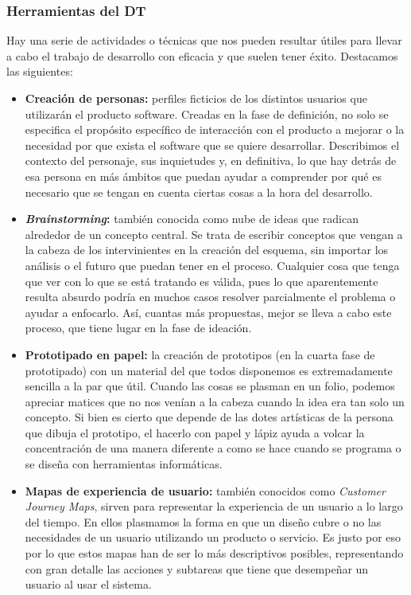 \subsubsection{Herramientas del DT}
\label{herramientasDT}

Hay una serie de actividades o técnicas que nos pueden resultar útiles para llevar a cabo el trabajo de desarrollo con eficacia y que suelen tener éxito. Destacamos las siguientes:

\begin{itemize}
	\item \textbf{Creación de personas:} perfiles ficticios de los distintos usuarios que utilizarán el producto software. Creadas en la fase de definición, no solo se especifica el propósito específico de interacción con el producto a mejorar o la necesidad por que exista el software que se quiere desarrollar. Describimos el contexto del personaje, sus inquietudes y, en definitiva, lo que hay detrás de esa persona en más ámbitos que puedan ayudar a comprender por qué es necesario que se tengan en cuenta ciertas cosas a la hora del desarrollo.
	
	\item \textbf{\textit{Brainstorming}:} también conocida como nube de ideas que radican alrededor de un concepto central. Se trata de escribir conceptos que vengan a la cabeza de los intervinientes en la creación del esquema, sin importar los análisis o el futuro que puedan tener en el proceso. Cualquier cosa que tenga que ver con lo que se está tratando es válida, pues lo que aparentemente resulta absurdo podría en muchos casos resolver parcialmente el problema o ayudar a enfocarlo. Así, cuantas más propuestas, mejor se lleva a cabo este proceso, que tiene lugar en la fase de ideación.
	
	\item \textbf{Prototipado en papel:} la creación de prototipos (en la cuarta fase de prototipado) con un material del que todos disponemos es extremadamente sencilla a la par que útil. Cuando las cosas se plasman en un folio, podemos apreciar matices que no nos venían a la cabeza cuando la idea era tan solo un concepto. Si bien es cierto que depende de las dotes artísticas de la persona que dibuja el prototipo, el hacerlo con papel y lápiz ayuda a volcar la concentración de una manera diferente a como se hace cuando se programa o se diseña con herramientas informáticas.
	
	\item \textbf{Mapas de experiencia de usuario:} también conocidos como \textit{Customer Journey Maps}, sirven para representar la experiencia de un usuario a lo largo del tiempo. En ellos plasmamos la forma en que un diseño cubre o no las necesidades de un usuario utilizando un producto o servicio. Es justo por eso por lo que estos mapas han de ser lo más descriptivos posibles, representando con gran detalle las acciones y subtareas que tiene que desempeñar un usuario al usar el sistema.
	
\end{itemize}

